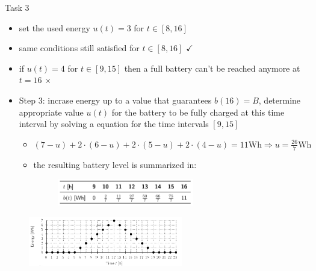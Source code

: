 \begin{frame}[allowframebreaks]{Task 3}{}
\begin{solutionnoinc}
\begin{itemize}
\begin{itemize}
\begin{itemize}
            \end{itemize}
          \item set the used energy $u(t) = 3$ for $t\in[8, 16]$
          \item same conditions still satisfied for $t\in [8, 16]$ $\checkmark$
          \item if $u(t)=4$ for $t\in[9, 15]$ then a full battery can't be reached anymore at $t=16$  $\times$
        \end{itemize}
      \end{itemize}
  \end{solutionnoinc}
  \begin{solutionnoinc}
    \begin{itemize}
      \item \alert{Step 3:} incrase energy up to a value that guarantees $b(16)=B$, determine appropriate value $u(t)$ for the battery to be fully charged at this time interval by solving a equation for the time intervals $[9, 15]$
      \begin{itemize}
        \item $(7-u)+2 \cdot(6-u)+2 \cdot(5-u)+2 \cdot(4-u)=11 \mathrm{Wh} \Rightarrow u=\frac{26}{7} \mathrm{Wh}$
        \item the resulting battery level is summarized in:
        \begin{figure}
          \centering
          \includegraphics[width=0.6\textwidth]{./figures/task3_table.png}
        \end{figure}
      \end{itemize}
    \end{itemize}
  \end{solutionnoinc}
  \framebreak
  \begin{solutionnoinc}
    \begin{figure}
      \centering
      \includegraphics[width=0.6\textwidth]{./figures/energyUsage_1_empty.png}
    \end{figure}
  \end{solutionnoinc}

\end{frame}
